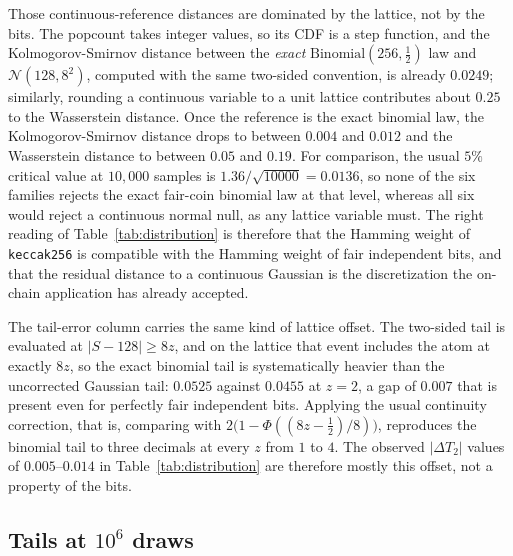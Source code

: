 \documentclass[11pt]{article}
\begin{document}
Those continuous-reference distances are dominated by the lattice, not by the
bits. The popcount takes integer values, so its CDF is a step function, and
the Kolmogorov-Smirnov distance between the \emph{exact}
$\mathrm{Binomial}(256,\tfrac12)$ law and $\mathcal{N}(128,8^2)$, computed with
the same two-sided convention, is already $0.0249$; similarly, rounding a
continuous variable to a unit lattice contributes about $0.25$ to the
Wasserstein distance. Once the reference is the exact binomial law, the
Kolmogorov-Smirnov distance drops to between $0.004$ and $0.012$ and the
Wasserstein distance to between $0.05$ and $0.19$. For comparison, the usual
$5\%$ critical value at $10{,}000$ samples is $1.36/\sqrt{10000}=0.0136$, so
none of the six families rejects the exact fair-coin binomial law at that
level, whereas all six would reject a continuous normal null, as any lattice
variable must. The right reading of Table~\ref{tab:distribution} is therefore
that the Hamming weight of \texttt{keccak256} is compatible with the Hamming
weight of fair independent bits, and that the residual distance to a
continuous Gaussian is the discretization the on-chain application has
already accepted.

\begin{table}[htbp]
\centering
\small

\caption{Finite-sample distributional diagnostics for the popcount.
KS$_{\mathcal N}$ and $W_1^{\mathcal N}$ are distances to the continuous
$\mathcal{N}(128,8^2)$ benchmark; KS$_{\mathrm{Bin}}$ and $W_1^{\mathrm{Bin}}$
are distances to the exact $\mathrm{Binomial}(256,\tfrac12)$ law. The
discreteness floor for KS$_{\mathcal N}$ is $0.0249$.}
\label{tab:distribution}
\end{table}

The tail-error column carries the same kind of lattice offset. The two-sided
tail is evaluated at $|S-128|\ge 8z$, and on the lattice that event includes
the atom at exactly $8z$, so the exact binomial tail is systematically
heavier than the uncorrected Gaussian tail: $0.0525$ against $0.0455$ at
$z=2$, a gap of $0.007$ that is present even for perfectly fair independent
bits. Applying the usual continuity correction, that is, comparing with
$2\bigl(1-\Phi((8z-\tfrac12)/8)\bigr)$, reproduces the binomial tail to three
decimals at every $z$ from $1$ to $4$. The observed $|\Delta T_2|$ values of
$0.005$--$0.014$ in Table~\ref{tab:distribution} are therefore mostly this
offset, not a property of the bits.

\subsection{Tails at $10^{6}$ draws}
\label{sec:tails}
\end{document}
